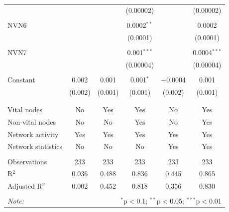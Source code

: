 \begin{table}[!htbp]
\begin{tabular}{@{\extracolsep{5pt}}lccccc}
  &  &  & (0.00002) &  & (0.00002) \\ 
  & & & & & \\ 
 NVN6 &  &  & 0.0002$^{**}$ &  & 0.0002 \\ 
  &  &  & (0.0001) &  & (0.0001) \\ 
  & & & & & \\ 
 NVN7 &  &  & 0.001$^{***}$ &  & 0.0004$^{***}$ \\ 
  &  &  & (0.00004) &  & (0.00004) \\ 
  & & & & & \\ 
 Constant & 0.002 & 0.001 & 0.001$^{*}$ & $-$0.0004 & 0.001 \\ 
  & (0.002) & (0.001) & (0.001) & (0.002) & (0.001) \\ 
  & & & & & \\ 
\hline \\[-1.8ex] 
Vital nodes & No & Yes & Yes & No & Yes \\ 
Non-vital nodes & No & No & Yes & No & Yes \\ 
Network activity & Yes & Yes & Yes & Yes & Yes \\ 
Network statistics & No & No & No & Yes & Yes \\ 
\hline &  &  &  &  &  \\ 
Observations & 233 & 233 & 233 & 233 & 233 \\ 
R$^{2}$ & 0.036 & 0.488 & 0.836 & 0.445 & 0.865 \\ 
Adjusted R$^{2}$ & 0.002 & 0.452 & 0.818 & 0.356 & 0.830 \\ 
\hline 
\hline \\[-1.8ex] 
\textit{Note:}  & \multicolumn{5}{r}{$^{*}$p$<$0.1; $^{**}$p$<$0.05; $^{***}$p$<$0.01} \\ 
\end{tabular} 
\end{table} 
